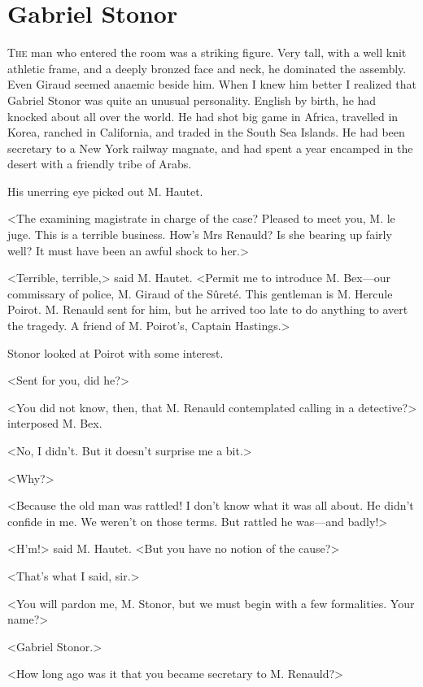 \chapter{Gabriel Stonor}

\lettrine{T}{he} man who entered the room was a striking figure. Very tall, with a well knit athletic frame, and a deeply bronzed face and neck, he dominated the assembly. Even Giraud seemed anaemic beside him. When I knew him better I realized that Gabriel Stonor was quite an unusual personality. English by birth, he had knocked about all over the world. He had shot big game in Africa, travelled in Korea, ranched in California, and traded in the South Sea Islands. He had been secretary to a New York railway magnate, and had spent a year encamped in the desert with a friendly tribe of Arabs. 

 His unerring eye picked out M. Hautet. 

 <The examining magistrate in charge of the case? Pleased to meet you, M. le juge. This is a terrible business. How's Mrs Renauld? Is she bearing up fairly well? It must have been an awful shock to her.> 

 <Terrible, terrible,> said M. Hautet. <Permit me to introduce M. Bex—our commissary of police, M. Giraud of the Sûreté. This gentleman is M. Hercule Poirot. M. Renauld sent for him, but he arrived too late to do anything to avert the tragedy. A friend of M. Poirot's, Captain Hastings.> 

 Stonor looked at Poirot with some interest. 

 <Sent for you, did he?> 

 <You did not know, then, that M. Renauld contemplated calling in a detective?> interposed M. Bex. 

 <No, I didn't. But it doesn't surprise me a bit.> 

 <Why?> 

 <Because the old man was rattled! I don't know what it was all about. He didn't confide in me. We weren't on those terms. But rattled he was—and badly!> 

 <H'm!> said M. Hautet. <But you have no notion of the cause?> 

 <That's what I said, sir.> 

 <You will pardon me, M. Stonor, but we must begin with a few formalities. Your name?> 

 <Gabriel Stonor.> 

 <How long ago was it that you became secretary to M. Renauld?> 

